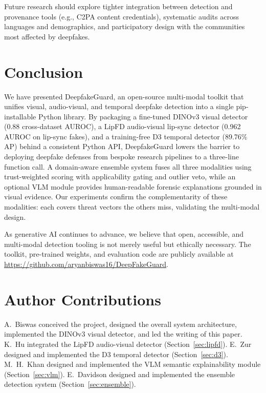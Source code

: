 \documentclass[conference]{IEEEtran}
\begin{document}
Future research should explore tighter integration between detection and provenance tools (e.g., C2PA content credentials), systematic audits across languages and demographics, and participatory design with the communities most affected by deepfakes.


\section{Conclusion} \label{sec:conclusion}

We have presented DeepfakeGuard, an open-source multi-modal toolkit that unifies visual, audio-visual, and temporal deepfake detection into a single pip-installable Python library. By packaging a fine-tuned DINOv3 visual detector (0.88 cross-dataset AUROC), a LipFD audio-visual lip-sync detector (0.962 AUROC on lip-sync fakes), and a training-free D3 temporal detector (89.76\% AP) behind a consistent Python API, DeepfakeGuard lowers the barrier to deploying deepfake defenses from bespoke research pipelines to a three-line function call. A domain-aware ensemble system fuses all three modalities using trust-weighted scoring with applicability gating and outlier veto, while an optional VLM module provides human-readable forensic explanations grounded in visual evidence. Our experiments confirm the complementarity of these modalities: each covers threat vectors the others miss, validating the multi-modal design.

As generative AI continues to advance, we believe that open, accessible, and multi-modal detection tooling is not merely useful but ethically necessary. The toolkit, pre-trained weights, and evaluation code are publicly available at \url{https://github.com/aryanbiswas16/DeepFakeGuard}.

\section*{Author Contributions}
A.~Biswas conceived the project, designed the overall system architecture, implemented the DINOv3 visual detector, and led the writing of this paper. K.~Hu integrated the LipFD audio-visual detector (Section~\ref{sec:lipfd}). E.~Zur designed and implemented the D3 temporal detector (Section~\ref{sec:d3}). M.~H.~Khan designed and implemented the VLM semantic explainability module (Section~\ref{sec:vlm}). E.~Davidson designed and implemented the ensemble detection system (Section~\ref{sec:ensemble}).
\end{document}
